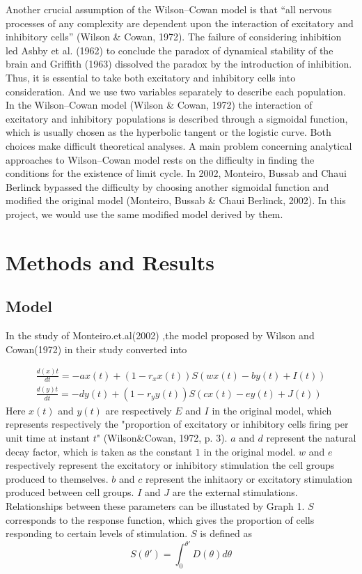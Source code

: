 \documentclass[12pt]{article}
\begin{document}
Another crucial assumption of the Wilson–Cowan model is that “all nervous
processes of any complexity are dependent upon the interaction of excitatory and
inhibitory cells” (Wilson \& Cowan, 1972). The failure of considering inhibition led Ashby et al. (1962) to conclude the paradox of dynamical stability of the brain and Griffith (1963) dissolved the paradox by the introduction of inhibition. Thus, it is essential to take both excitatory and inhibitory cells into consideration. And we use two variables separately to describe each population.
In the Wilson–Cowan model (Wilson \& Cowan, 1972) the interaction of excitatory and inhibitory populations is described through a sigmoidal function, which is usually chosen as the hyperbolic tangent or the logistic curve. Both choices make difficult theoretical analyses. A main problem concerning analytical approaches to Wilson–Cowan model rests on the difficulty in finding the conditions for the existence of limit cycle. In 2002, Monteiro, Bussab and Chaui Berlinck bypassed the difficulty by choosing another sigmoidal function and modified the original model (Monteiro, Bussab \& Chaui Berlinck, 2002). In this project, we would use the same modified model derived by them.



\section{ Methods and Results}
\subsection{Model}
  In the study of Monteiro.et.al(2002) ,the model proposed by Wilson and Cowan(1972) in their study converted into
  
  \begin{equation}
    \begin{matrix}
      \frac{d(x)t}{dt}=-ax(t)+(1-r_xx(t))S(wx(t)-by(t)+I(t))
      \\
      \frac{d(y)t}{dt}=-dy(t)+(1-r_yy(t))S(cx(t)-ey(t)+J(t))
      \end{matrix}
  \end{equation}
  \indent Here $x(t)$ and $y(t)$ are respectively $E$ and $I$ in the original model, which represents respectively the "proportion of excitatory or inhibitory cells firing per unit time at instant $t$" (Wilson\&Cowan, 1972, p. 3). $a$ and $d$ represent the natural decay factor, which is taken as the constant $1$ in the original model. $w$ and $e$ respectively represent the excitatory or inhibitory stimulation the cell groups produced to themselves. $b$ and $c$ represent the inhitaory or excitatory stimulation produced between cell groups. $I$ and $J$ are the external stimulations. Relationships between these parameters can be illustated by Graph 1. $S$ corresponds to the response function, which gives the proportion of cells responding to certain levels of stimulation. $S$ is defined as
  \begin{equation}
    S(\theta')=\int_0^{\theta'}D(\theta)d\theta
  \end{equation}
\end{document}
